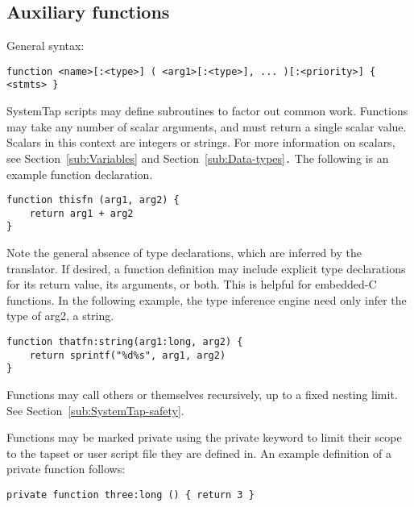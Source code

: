 \documentclass[twoside,english]{article}
\newenvironment{vindent}
{\begin{list}{}{\setlength{\listparindent}{6pt}}
\item[]}
{\end{list}}
\begin{document}
\subsection{Auxiliary functions\label{sub:Auxiliary-functions}}
General syntax:

\begin{vindent}
\begin{verbatim}
function <name>[:<type>] ( <arg1>[:<type>], ... )[:<priority>] { <stmts> }
\end{verbatim}
\end{vindent}
SystemTap scripts may define subroutines to factor out common work. Functions
may take any number of scalar arguments, and must return a single scalar
value. Scalars in this context are integers or strings. For more information
on scalars, see Section~\ref{sub:Variables} and Section~\ref{sub:Data-types}\texttt{.}
The following is an example function declaration.

\begin{vindent}
\begin{verbatim}
function thisfn (arg1, arg2) {
    return arg1 + arg2
}
\end{verbatim}
\end{vindent}

Note the general absence of type declarations, which are inferred by the
translator. If desired, a function definition may include explicit type declarations
for its return value, its arguments, or both. This is helpful for embedded-C
functions. In the following example, the type inference engine need only
infer the type of arg2, a string.

\begin{vindent}
\begin{verbatim}
function thatfn:string(arg1:long, arg2) {
    return sprintf("%d%s", arg1, arg2)
}
\end{verbatim}
\end{vindent}

Functions may call others or themselves recursively, up to a fixed nesting
limit. See Section~\ref{sub:SystemTap-safety}.

Functions may be marked private using the private keyword to limit their scope
to the tapset or user script file they are defined in. An example definition of
a private function follows:

\begin{vindent}
\begin{verbatim}
private function three:long () { return 3 }
\end{verbatim}
\end{vindent}
\end{document}
